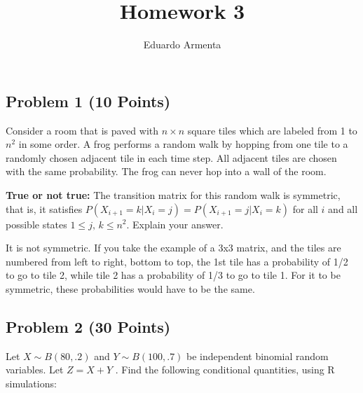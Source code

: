\documentclass[
]{article}
\title{Homework 3}
\author{Eduardo Armenta}
\date{}
\newenvironment{Shaded}{\begin{snugshade}}{\end{snugshade}}
\newcommand{\AttributeTok}[1]{\textcolor[rgb]{0.77,0.63,0.00}{#1}}
\newcommand{\DecValTok}[1]{\textcolor[rgb]{0.00,0.00,0.81}{#1}}
\newcommand{\FunctionTok}[1]{\textcolor[rgb]{0.00,0.00,0.00}{#1}}
\newcommand{\NormalTok}[1]{#1}
\newcommand{\OtherTok}[1]{\textcolor[rgb]{0.56,0.35,0.01}{#1}}
\newcommand{\SpecialCharTok}[1]{\textcolor[rgb]{0.00,0.00,0.00}{#1}}
\begin{document}
\maketitle

\hypertarget{problem-1-10-points}{%
\subsection{Problem 1 (10 Points)}\label{problem-1-10-points}}

Consider a room that is paved with \(n \times n\) square tiles which are
labeled from 1 to \(n^2\) in some order. A frog performs a random walk
by hopping from one tile to a randomly chosen adjacent tile in each time
step. All adjacent tiles are chosen with the same probability. The frog
can never hop into a wall of the room.

\textbf{True or not true:} The transition matrix for this random walk is
symmetric, that is, it satisfies
\(P(X_{i+1} = k| X_i = j) = P(X_{i+1} = j|X_i = k)\) for all \(i\) and
all possible states \(1 \le j, \, k \le n^2\). Explain your answer.

It is not symmetric. If you take the example of a 3x3 matrix, and the
tiles are numbered from left to right, bottom to top, the 1st tile has a
probability of 1/2 to go to tile 2, while tile 2 has a probability of
1/3 to go to tile 1. For it to be symmetric, these probabilities would
have to be the same.

\hypertarget{problem-2-30-points}{%
\subsection{Problem 2 (30 Points)}\label{problem-2-30-points}}

Let \(X \sim B(80, .2)\) and \(Y \sim B(100, .7)\) be independent
binomial random variables. Let \(Z = X + Y\) . Find the following
conditional quantities, using R simulations:

\begin{Shaded}
\end{Shaded}
\end{document}
